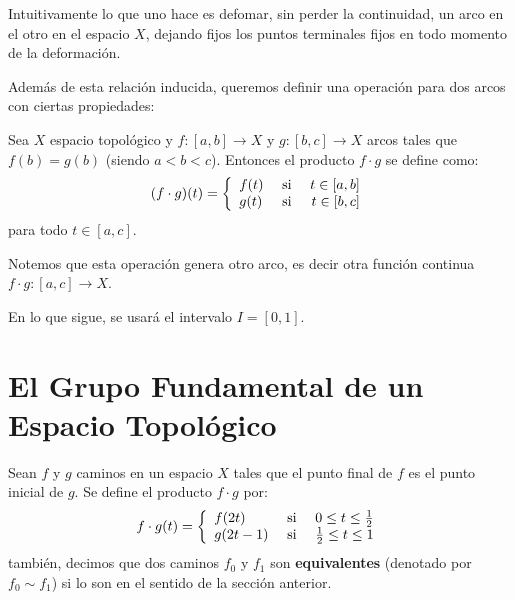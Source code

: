 \documentclass[12pt]{report}
\theoremstyle{largebreak}
\newcommand\cf[3]{\ensuremath{#1:#2\rightarrow#3}}
\begin{document}
    Intuitivamente lo que uno hace es defomar, sin perder la continuidad, un arco en el otro en el espacio $X$, dejando fijos los puntos terminales fijos en todo momento de la deformación.

    Además de esta relación inducida, queremos definir una operación para dos arcos con ciertas propiedades:

    \begin{mydef}
        Sea $X$ espacio topológico y $\cf{f}{[a,b]}{X}$ y $\cf{g}{[b,c]}{X}$ arcos tales que $f(b)=g(b)$ (siendo $a<b<c$). Entonces el producto $f\cdot g$ se define como:
        \begin{equation*}
            (f\cdot g)(t)=\left\{
                \begin{array}{lcr}
                    f(t) & \textup{ si } & t\in[a,b]\\
                    g(t) & \textup{ si } & t\in[b,c]\\
                \end{array}
            \right.
        \end{equation*}
        para todo $t\in[a,c]$.
    \end{mydef}

    \begin{obs}
        Notemos que esta operación genera otro arco, es decir otra función continua $\cf{f\cdot g}{[a,c]}{X}$.
    \end{obs}

    En lo que sigue, se usará el intervalo $I=[0,1]$.

    \section{El Grupo Fundamental de un Espacio Topológico}

    \begin{mydef}
        Sean $f$ y $g$ caminos en un espacio $X$ tales que el punto final de $f$ es el punto inicial de $g$. Se define el producto $f\cdot g$ por:
        \begin{equation*}
            f\cdot g(t)=\left\{
                \begin{array}{lcr}
                    f(2t) & \textup{ si } & 0\leq t\leq\frac{1}{2}\\
                    g(2t-1) & \textup{ si } & \frac{1}{2}\leq t\leq1\\
                \end{array}
            \right.
        \end{equation*}
        también, decimos que dos caminos $f_0$ y $f_1$ son \textbf{equivalentes} (denotado por $f_0\sim f_1$) si lo son en el sentido de la sección anterior.
    \end{mydef}
\end{document}
